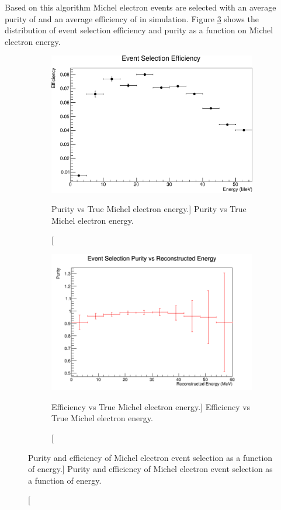 Based on this algorithm Michel electron events are selected with an average
purity of  and an average efficiency of  
in \protodune{} simulation. Figure \ref{fig:eff_and_pur} shows the
distribution of event selection efficiency and purity as a function on Michel
electron energy. 
\begin{figure}
	\centering
	\begin{subfigure}[b]{\textwidth}
		\includegraphics[width=\textwidth, height=0.68\textwidth]{figures/eff_v_energy.pdf}
		\caption
		[Purity vs True Michel electron energy.]
		{Purity vs True Michel electron energy.}
		\label{fig:eff_v_energy}
	\end{subfigure}
	\begin{subfigure}[b]{\textwidth}
		\includegraphics[width=\textwidth]{figures/MC_purity_v_energy.png}
		\caption
		[Efficiency vs True Michel electron energy.]
		{Efficiency vs True Michel electron energy.}
		\label{fig:pur_v_energy}
	\end{subfigure}

	\caption
	[Purity and efficiency of Michel electron event selection as a function of
	energy.]
	{Purity and efficiency of Michel electron event selection as a function of
	energy.}

	\label{fig:eff_and_pur}

\end{figure}

